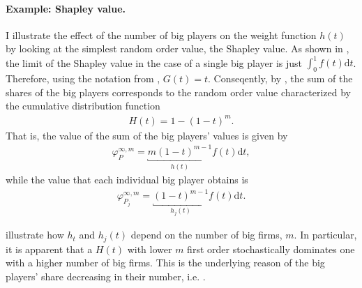 \documentclass[a4paper]{article}
\newcommand{\dt}{\mathrm{d}t}
\begin{document}
\paragraph{Example: Shapley value.}

I illustrate the effect of the number of big players on the weight function $h(t)$ by looking at the simplest random order value, the Shapley value.
As shown in , the limit of the Shapley value in the case of a single big player is just $\int_0^1 f(t) \dt$.
Therefore, using the notation from , $G(t) = t$.
Conseqently, by , the sum of the shares of the big players corresponds to the random order value characterized by the cumulative distribution function
\begin{align} 
    H(t) = 1 - (1 - t)^m.  \label{eq:weight_function_shapley}
\end{align}
That is, the value of the sum of the big players' values is given by
\begin{align*}
    \varphi_P^{\infty, m} = \underbracket{m (1-t) ^ {m-1}}_{h(t)} f(t) \dt,
\end{align*}
while the value that each individual big player obtains is
\begin{align*}
    \varphi_{P_j}^{\infty, m} = \underbracket{(1-t) ^ {m-1}}_{h_j(t)} f(t) \dt.
\end{align*}

 illustrate how $h_t$ and $h_j(t)$ depend on the number of big firms, $m$.
In particular, it is apparent that a $H(t)$ with lower $m$ first order stochastically dominates one with a higher number of big firms.
This is the underlying reason of the big players' share decreasing in their number, i.e. .
\end{document}
